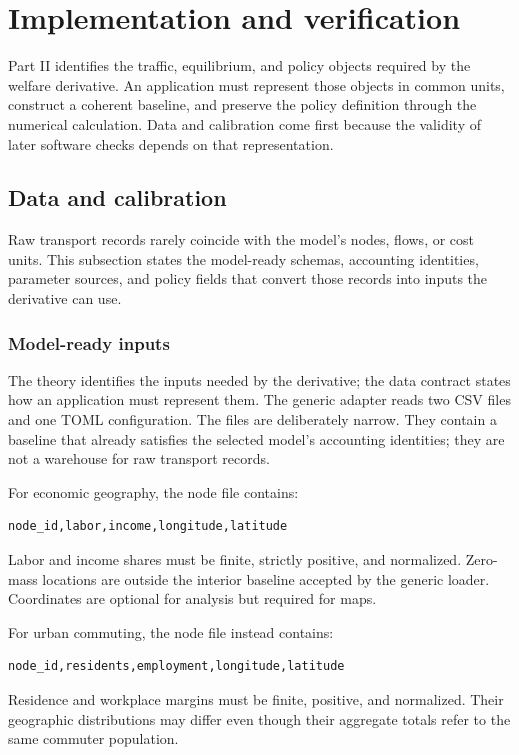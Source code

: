 \section{Implementation and verification}
\label{ch:implementation}

Part II identifies the traffic, equilibrium, and policy objects required by
the welfare derivative. An application must represent those objects in common
units, construct a coherent baseline, and preserve the policy definition
through the numerical calculation. Data and calibration come first because
the validity of later software checks depends on that representation.

\subsection{Data and calibration}
\label{ch:data}

Raw transport records rarely coincide with the model's nodes, flows, or cost
units. This subsection states the model-ready schemas, accounting identities,
parameter sources, and policy fields that convert those records into inputs
the derivative can use.

\subsubsection{Model-ready inputs}

The theory identifies the inputs needed by the derivative; the data contract
states how an application must represent them.
The generic adapter reads two CSV files and one TOML configuration. The files
are deliberately narrow. They contain a baseline that already satisfies the
selected model's accounting identities; they are not a warehouse for raw
transport records.

For economic geography, the node file contains:
\begin{lstlisting}
node_id,labor,income,longitude,latitude
\end{lstlisting}
Labor and income shares must be finite, strictly positive, and normalized.
Zero-mass locations are outside the interior baseline accepted by the generic
loader. Coordinates are optional for analysis but required for maps.

For urban commuting, the node file instead contains:
\begin{lstlisting}
node_id,residents,employment,longitude,latitude
\end{lstlisting}
Residence and workplace margins must be finite, positive, and normalized.
Their geographic distributions may differ even though their aggregate totals
refer to the same commuter population.

